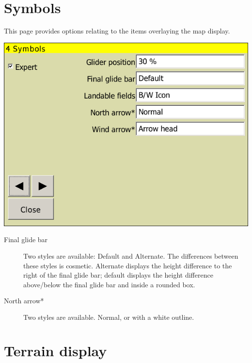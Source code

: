 


\clearpage
\section{Symbols}\label{sec:symbols}

This page provides options relating to the items overlaying the map display.

\begin{center}
\includegraphics[angle=0,width=0.8\linewidth,keepaspectratio='true']{figures/config-symbols.png}
\end{center}

\begin{description}


\item[Final glide bar]  Two styles are available: Default and
Alternate. The differences between these styles is cosmetic.  Alternate displays the height difference to the 
right of the final glide bar; default displays the height difference above/below the final glide bar and inside a 
rounded box.

\item[North arrow*]  Two styles are available.  Normal, or with a white outline.
\end{description}

\clearpage
\section{Terrain display}\label{sec:terrain-display}

